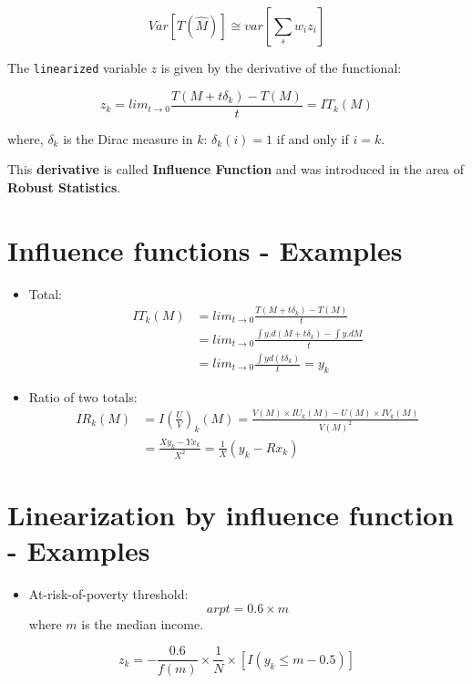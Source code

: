 \documentclass[]{book}
\providecommand{\tightlist}{%
  \setlength{\itemsep}{0pt}\setlength{\parskip}{0pt}}
\begin{document}
\[Var\left[T(\hat{M})\right]\cong var\left[\sum_s w_i z_i\right]\]

The \texttt{linearized} variable \(z\) is given by the derivative of the
functional:

\[
z_k=lim_{t\rightarrow0}\frac{T(M+t\delta_k)-T(M)}{t}=IT_k(M)
\]

where, \(\delta_k\) is the Dirac measure in \(k\): \(\delta_k(i)=1\) if
and only if \(i=k\).

This \textbf{derivative} is called \textbf{Influence Function} and was
introduced in the area of \textbf{Robust Statistics}.

\section{Influence functions -
Examples}\label{influence-functions---examples}

\begin{itemize}
\item
  Total: \[
  \begin{aligned}
  IT_k(M)&=lim_{t\rightarrow 0}\frac{T(M+t\delta_k)-T(M)}{t}\\
  &=lim_{t\rightarrow 0}\frac{\int y.d(M+t\delta_k)-\int y.dM}{t}\\
  &=lim_{t\rightarrow 0}\frac{\int yd(t\delta_k)}{t}=y_k  
  \end{aligned}
  \]
\item
  Ratio of two totals: \[
  \begin{aligned}
  IR_k(M)&=I\left(\frac{U}{V}\right)_k(M)=\frac{V(M)\times IU_k(M)-U(M)\times IV_k(M)}{V(M)^2}\\
  &=\frac{X y_k-Y x_k}{X^2}=\frac{1}{X}(y_k-Rx_k)
  \end{aligned}
  \]
\end{itemize}

\section{Linearization by influence function -
Examples}\label{linearization-by-influence-function---examples}

\begin{itemize}
\tightlist
\item
  At-risk-of-poverty threshold: \[
  arpt = 0.6\times m
  \] where \(m\) is the median income.
\end{itemize}

\[
z_k= -\frac{0.6}{f(m)}\times\frac{1}{N}\times\left[I(y_k\leq m-0.5) \right]
\]
\end{document}
